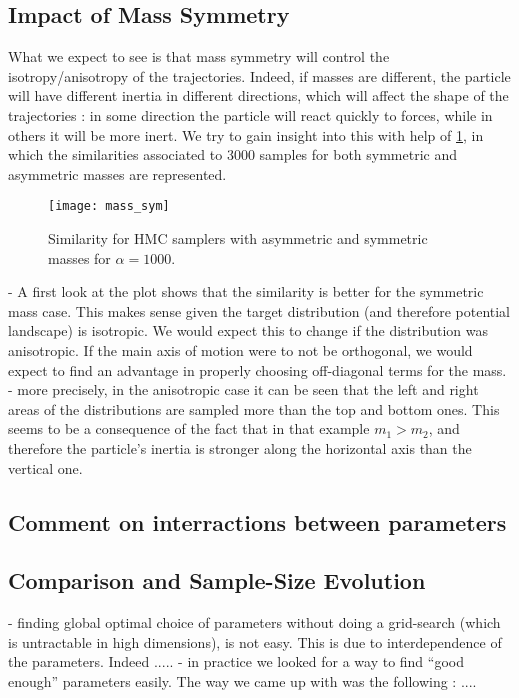 \documentclass[a4paper, 12pt,oneside]{article}
\begin{document}
			\subsection{Impact of Mass Symmetry}
			What we expect to see is that mass symmetry will control the isotropy/anisotropy of the trajectories. Indeed, if masses are different, the particle will have different inertia in different directions, which will affect the shape of the trajectories : in some direction the particle will react quickly to forces, while in others it will be more inert. We try to gain insight into this with help of  \ref{fig:mass-sym}, in which the similarities associated to 3000 samples for both symmetric and asymmetric masses are represented.
			\begin{figure}[htb]
				\centering
					\vspace{0em}
					\texttt{[image: mass\_sym]}
					\caption{Similarity for HMC samplers with asymmetric and symmetric masses for $\alpha=1000$.}
					\label{fig:mass-sym}
			\end{figure}
			- A first look at the plot shows that the similarity is better for the symmetric mass case. This makes sense given the target distribution (and therefore potential landscape) is isotropic. We would expect this to change if the distribution was anisotropic. If the main axis of motion were to not be orthogonal, we would expect to find an advantage in properly choosing off-diagonal terms for the mass. 
			- more precisely, in the anisotropic case it can be seen that the left and right areas of the distributions are sampled more than the top and bottom ones. This seems to be a consequence of the fact that in that example $m_1>m_2$, and therefore the particle's inertia is stronger along the horizontal axis than the vertical one. 
			\subsection{Comment on interractions between parameters}
		\subsection{Comparison and Sample-Size Evolution}
		- finding global optimal choice of parameters without doing a grid-search (which is untractable in high dimensions), is not easy. This is due to interdependence of the parameters. Indeed .....
		- in practice we looked for a way to find ``good enough'' parameters easily. The way we came up with was the following : 
		....
\end{document}
